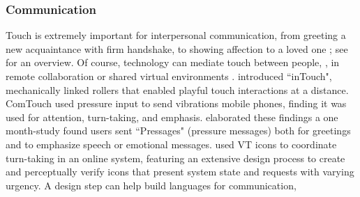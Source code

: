 \subsubsection{ Communication}
Touch is extremely important for interpersonal communication, from greeting a new acquaintance with firm handshake, to showing affection to a loved one ; see \citet{Gallace2010} for an overview.
Of course, technology can mediate touch between people, \eg, in remote collaboration or shared virtual environments \cite{Haans2006}.
\citet{Brave1997} introduced ``inTouch", mechanically linked rollers that enabled playful touch interactions at a distance.
ComTouch \cite{Chang2002a} used pressure input to send vibrations  mobile phones, finding it was used for attention, turn-taking, and emphasis.
\citet{Hoggan2012} elaborated  these findings\revRG{:} a one month-study found users sent ``Pressages" (pressure messages) both for greetings and to emphasize speech or emotional messages.
\citet{Chan2008} used VT icons to coordinate turn-taking in an online system, featuring an extensive design process to create and perceptually verify icons that present system state and requests with varying urgency.
A design step can help build languages for communication, 





